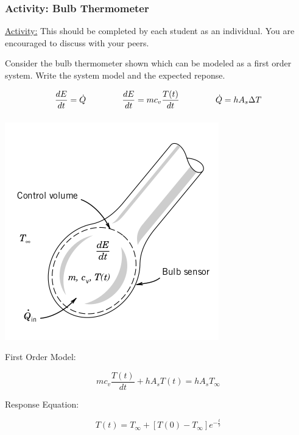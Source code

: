 \documentclass[fleqn]{beamer} %
\newcommand{\sectionIIsubsectionIVtitle}{Activity: Bulb Thermometer}
\begin{document}
			\begin{frame}
				\frametitle{\sectionIIsubsectionIVtitle}


{\scriptsize \underline{Activity:} This should be completed by each student as an individual. You are encouraged to discuss with your peers. }

Consider the bulb thermometer shown which can be modeled as a first order system.  Write the system model and the expected reponse.

\[ \frac{dE}{dt}=\dot{Q}\hspace{15mm} \frac{dE}{dt}=mc_v\frac{T(t)}{dt} \hspace{15mm}\dot{Q}=hA_s\Delta T \]
\[ \]

\begin{multicols}{2}

\includegraphics[scale=.35]{images/bulb_thermometer.png}

First Order Model:
\begin{fleqn}
\[ mc_v\frac{T(t)}{dt}+hA_sT(t)=hA_sT_\infty \] 
\end{fleqn}

Response Equation:
\begin{fleqn}
\[ T(t)=T_\infty+\left[ T\left(0\right)-T_\infty \right]e^{-\frac{t}{\tau}} \] 
\end{fleqn}


\end{multicols}


			\end{frame}
\end{document}

